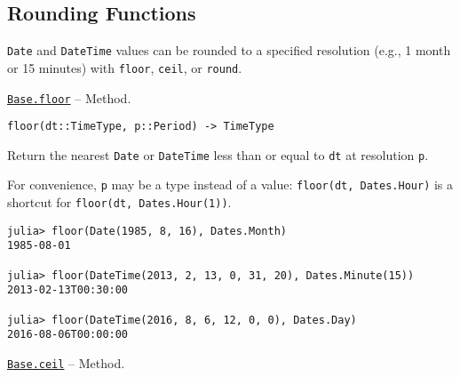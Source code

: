 \hypertarget{17803150666173094488}{}


\subsection{Rounding Functions}



\texttt{Date} and \texttt{DateTime} values can be rounded to a specified resolution (e.g., 1 month or 15 minutes) with \texttt{floor}, \texttt{ceil}, or \texttt{round}.


\hypertarget{6962549236860281908}{} 
\hyperlink{6962549236860281908}{\texttt{Base.floor}}  -- {Method.}

\begin{adjustwidth}{2em}{0pt}


\begin{verbatim}
floor(dt::TimeType, p::Period) -> TimeType
\end{verbatim}

Return the nearest \texttt{Date} or \texttt{DateTime} less than or equal to \texttt{dt} at resolution \texttt{p}.

For convenience, \texttt{p} may be a type instead of a value: \texttt{floor(dt, Dates.Hour)} is a shortcut for \texttt{floor(dt, Dates.Hour(1))}.


\begin{verbatim}
julia> floor(Date(1985, 8, 16), Dates.Month)
1985-08-01

julia> floor(DateTime(2013, 2, 13, 0, 31, 20), Dates.Minute(15))
2013-02-13T00:30:00

julia> floor(DateTime(2016, 8, 6, 12, 0, 0), Dates.Day)
2016-08-06T00:00:00
\end{verbatim}



\end{adjustwidth}
\hypertarget{13217485408632363978}{} 
\hyperlink{13217485408632363978}{\texttt{Base.ceil}}  -- {Method.}

